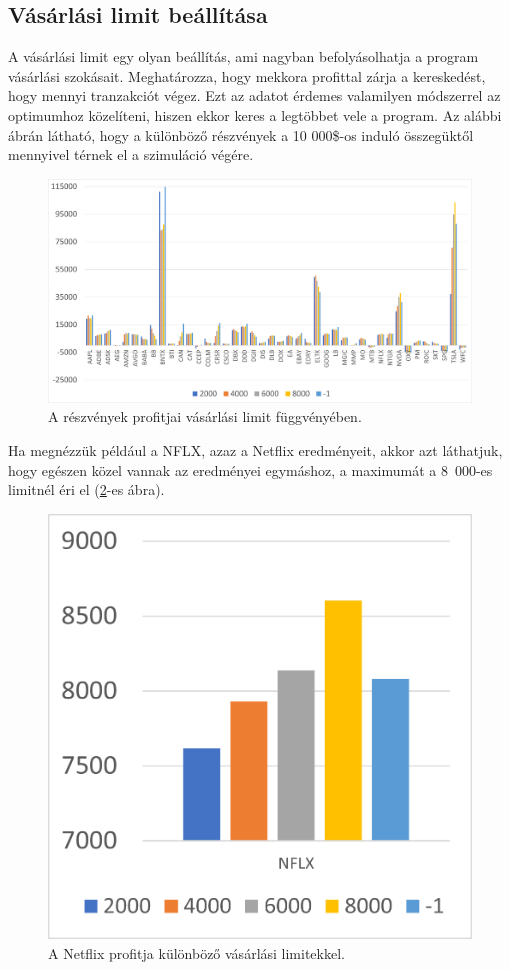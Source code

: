 \subsection{Vásárlási limit beállítása}
A vásárlási limit egy olyan beállítás, ami nagyban befolyásolhatja a program vásárlási szokásait. Meghatározza, hogy mekkora profittal zárja a kereskedést, hogy mennyi tranzakciót végez. Ezt az adatot érdemes valamilyen módszerrel az optimumhoz közelíteni, hiszen ekkor keres a legtöbbet vele a program. Az alábbi ábrán látható, hogy a különböző részvények a 10 000\$-os induló összegüktől mennyivel térnek el a szimuláció végére.
\begin{figure}[ht]
\centering
\includegraphics[scale=0.42]{images/limitdiag.png}
\caption{A részvények profitjai vásárlási limit függvényében.}
\label{fig:limitdiag}
\end{figure}
Ha megnézzük például a NFLX, azaz a Netflix eredményeit, akkor azt láthatjuk, hogy egészen közel vannak az eredményei egymáshoz, a maximumát a \mbox{8 000}-es limitnél éri el (\ref{fig:NFLX}-es ábra).
\begin{figure}[ht]
\centering
\includegraphics[scale=0.7]{images/NFLX.png}
\caption{A Netflix profitja különböző vásárlási limitekkel.}
\label{fig:NFLX}
\end{figure}
